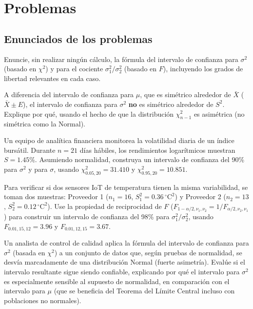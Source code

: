 \section*{Problemas}

\subsection*{Enunciados de los problemas}

\begin{problema}
	\label{prob:05ea7a1}
	Enuncie, sin realizar ningún cálculo, la fórmula del intervalo de confianza para $\sigma^2$ (basado en $\chi^2$) y para el cociente $\sigma_1^2/\sigma_2^2$ (basado en $F$), incluyendo los grados de libertad relevantes en cada caso.
\end{problema}

\begin{problema}
	\label{prob:c70c188}
	A diferencia del intervalo de confianza para $\mu$, que es simétrico alrededor de $\bar X$ ($\bar X\pm E$), el intervalo de confianza para $\sigma^2$ \textbf{no} es simétrico alrededor de $S^2$. Explique por qué, usando el hecho de que la distribución $\chi^2_{n-1}$ es asimétrica (no simétrica como la Normal).
\end{problema}

\begin{problema}
	\label{prob:fa97dc8}
	Un equipo de analítica financiera monitorea la volatilidad diaria de un índice bursátil. Durante $n=21$ días hábiles, los rendimientos logarítmicos muestran $S=1.45\%$. Asumiendo normalidad, construya un intervalo de confianza del 90\% para $\sigma^2$ y para $\sigma$, usando $\chi^2_{0.05,20}=31.410$ y $\chi^2_{0.95,20}=10.851$.
\end{problema}

\begin{problema}
	\label{prob:33162ae}
	Para verificar si dos sensores IoT de temperatura tienen la misma variabilidad, se toman dos muestras: Proveedor 1 ($n_1=16$, $S_1^2=0.36\,^\circ\text{C}^2$) y Proveedor 2 ($n_2=13$, $S_2^2=0.12\,^\circ\text{C}^2$). Use la propiedad de reciprocidad de $F$ ($F_{1-\alpha/2,\nu_1,\nu_2}=1/F_{\alpha/2,\nu_2,\nu_1}$) para construir un intervalo de confianza del 98\% para $\sigma_1^2/\sigma_2^2$, usando $F_{0.01,15,12}=3.96$ y $F_{0.01,12,15}=3.67$.
\end{problema}

\begin{problema}
	\label{prob:6bad87b}
	Un analista de control de calidad aplica la fórmula del intervalo de confianza para $\sigma^2$ (basada en $\chi^2$) a un conjunto de datos que, según pruebas de normalidad, se desvía marcadamente de una distribución Normal (fuerte asimetría). Evalúe si el intervalo resultante sigue siendo confiable, explicando por qué el intervalo para $\sigma^2$ es especialmente sensible al supuesto de normalidad, en comparación con el intervalo para $\mu$ (que se beneficia del Teorema del Límite Central incluso con poblaciones no normales).
\end{problema}

